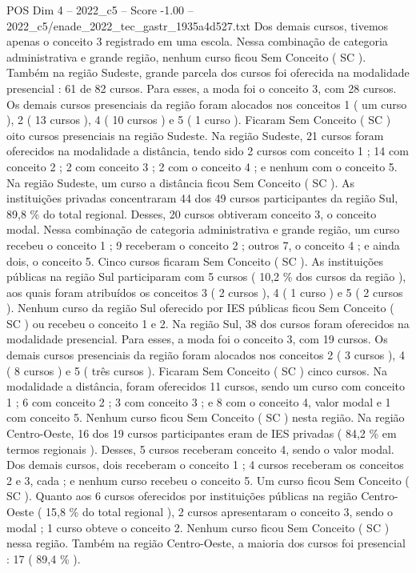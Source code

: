 \begin{textsample}{POS Dim 4 – 2022\_c5 – Score -1.00 – 2022\_c5/enade\_2022\_tec\_gastr\_1935a4d527.txt}
Dos demais cursos, tivemos apenas o conceito 3 registrado em uma escola.
Nessa combinação de categoria administrativa e grande região, nenhum curso ficou Sem Conceito ( SC ).
Também na região Sudeste, grande parcela dos cursos foi oferecida na modalidade presencial : 61 de 82 cursos.
Para esses, a moda foi o conceito 3, com 28 cursos.
Os demais cursos presenciais da região foram alocados nos conceitos 1 ( um curso ), 2 ( 13 cursos ), 4 ( 10 cursos ) e 5 ( 1 curso ).
Ficaram Sem Conceito ( SC ) oito cursos presenciais na região Sudeste.
Na região Sudeste, 21 cursos foram oferecidos na modalidade a distância, tendo sido 2 cursos com conceito 1 ; 14 com conceito 2 ; 2 com conceito 3 ; 2 com o conceito 4 ; e nenhum com o conceito 5.
Na região Sudeste, um curso a distância ficou Sem Conceito ( SC ).
As instituições privadas concentraram 44 dos 49 cursos participantes da região Sul, 89,8 \% do total regional.
Desses, 20 cursos obtiveram conceito 3, o conceito modal.
Nessa combinação de categoria administrativa e grande região, um curso recebeu o conceito 1 ; 9 receberam o conceito 2 ; outros 7, o conceito 4 ; e ainda dois, o conceito 5.
Cinco cursos ficaram Sem Conceito ( SC ).
As instituições públicas na região Sul participaram com 5 cursos ( 10,2 \% dos cursos da região ), aos quais foram atribuídos os conceitos 3 ( 2 cursos ), 4 ( 1 curso ) e 5 ( 2 cursos ).
Nenhum curso da região Sul oferecido por IES públicas ficou Sem Conceito ( SC ) ou recebeu o conceito 1 e 2.
Na região Sul, 38 dos cursos foram oferecidos na modalidade presencial.
Para esses, a moda foi o conceito 3, com 19 cursos.
Os demais cursos presenciais da região foram alocados nos conceitos 2 ( 3 cursos ), 4 ( 8 cursos ) e 5 ( três cursos ).
Ficaram Sem Conceito ( SC ) cinco cursos.
Na modalidade a distância, foram oferecidos 11 cursos, sendo um curso com conceito 1 ; 6 com conceito 2 ; 3 com conceito 3 ; e 8 com o conceito 4, valor modal e 1 com conceito 5.
Nenhum curso ficou Sem Conceito ( SC ) nesta região.
Na região Centro-Oeste, 16 dos 19 cursos participantes eram de IES privadas ( 84,2 \% em termos regionais ).
Desses, 5 cursos receberam conceito 4, sendo o valor modal.
Dos demais cursos, dois receberam o conceito 1 ; 4 cursos receberam os conceitos 2 e 3, cada ; e nenhum curso recebeu o conceito 5.
Um curso ficou Sem Conceito ( SC ).
Quanto aos 6 cursos oferecidos por instituições públicas na região Centro-Oeste ( 15,8 \% do total regional ), 2 cursos apresentaram o conceito 3, sendo o modal ; 1 curso obteve o conceito 2.
Nenhum curso ficou Sem Conceito ( SC ) nessa região.
Também na região Centro-Oeste, a maioria dos cursos foi presencial : 17 ( 89,4 \% ).

\end{textsample}
